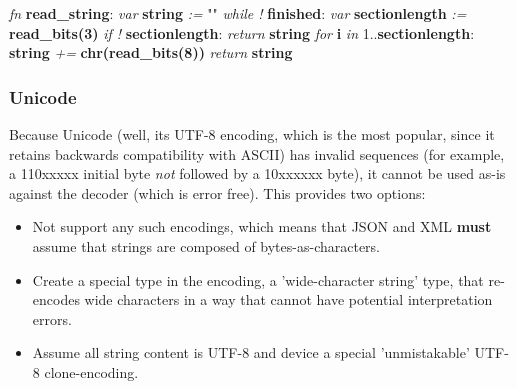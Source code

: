 \begin{changemargin}{-60mm}{0mm}
\begin{myquote}

\vbox{
\textit{fn} \textbf{read\_string}: \newline
\indent\hspace{.5cm} \textit{var} \textbf{string} \textit{:=} "" \newline
\indent\hspace{.5cm} \textit{while !} \textbf{finished}: \newline
\indent\hspace{1cm} \textit{var} \textbf{sectionlength} \textit{:=} \textbf{read\_bits(3)} \newline
\indent\hspace{1cm} \textit{if !} \textbf{sectionlength}: \newline
\indent\hspace{1.5cm} \textit{return} \textbf{string} \newline
\indent\hspace{1cm} \textit{for} \textbf{i} \textit{in} 1..\textbf{sectionlength}: \newline
\indent\hspace{1.5cm} \textbf{string} \textit{+=} \textbf{chr(read\_bits(8))} \newline
\indent\hspace{.5cm} \textit{return} \textbf{string} \newline
}

\end{myquote}
\end{changemargin}

\subsubsection{Unicode}

Because Unicode (well, its UTF-8 encoding, which is the most popular, since
it retains backwards compatibility with ASCII) has invalid sequences
(for example, a 110xxxxx initial byte \textit{not} followed by a
10xxxxxx byte), it cannot be used as-is against the decoder (which is error
free). This provides two options:

\begin{itemize}
\item Not support any such encodings, which means that JSON and XML
      \textbf{must} assume that strings are composed of bytes-as-characters.
\item Create a special type in the encoding, a 'wide-character string' type,
      that re-encodes wide characters in a way that cannot have
      potential interpretation errors.
\item Assume all string content is UTF-8 and device a special
      'unmistakable' UTF-8 clone-encoding.
\end{itemize}

